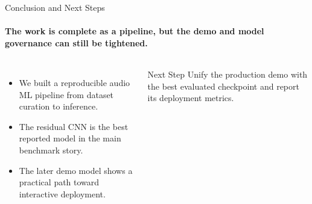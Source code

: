 \documentclass[aspectratio=169,10pt]{beamer}
\begin{document}
\begin{frame}{Conclusion and Next Steps}
\framesubtitle{The work is complete as a pipeline, but the demo and model governance can still be tightened.}
\begin{columns}[T,totalwidth=\textwidth]
\begin{itemize}
  \item We built a reproducible audio ML pipeline from dataset curation to inference.
  \item The residual CNN is the best reported model in the main benchmark story.
  \item The later demo model shows a practical path toward interactive deployment.
\end{itemize}
\vspace{0.3cm}
\begin{block}{Next Step}
Unify the production demo with the best evaluated checkpoint and report its deployment metrics.
\end{block}

\centering
{}
\end{columns}
\end{frame}
\end{document}
